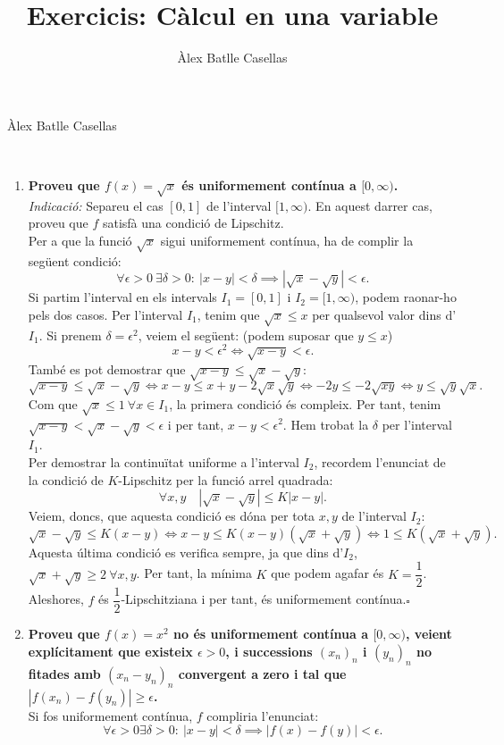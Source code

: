 \documentclass[11pt]{article}
\title{Exercicis: Càlcul en una variable}
\author{Àlex Batlle Casellas}
\begin{document}
\begin{small}
Àlex Batlle Casellas
\end{small}\\
\begin{enumerate}
	\item \textbf{Proveu que $f(x)=\sqrt{x}$ és uniformement contínua a $[0,\infty)$.}\\
	\textit{Indicació:} Separeu el cas $[0,1]$ de l'interval $[1,\infty)$. En aquest darrer cas, proveu que $f$ satisfà una condició de Lipschitz.\\
	Per a que la funció $\sqrt{x}$ sigui uniformement contínua, ha de complir la següent condició:
	$$\forall\epsilon>0\ \exists\delta>0:\ |x-y|<\delta\implies|\sqrt{x}-\sqrt{y}|<\epsilon.$$
	Si partim l'interval en els intervals $I_1=[0,1]$ i $I_2=[1,\infty)$, podem raonar-ho pels dos casos. Per l'interval $I_1$, tenim que $\sqrt{x}\leq x$ per qualsevol valor dins d'$I_1$. Si prenem $\delta=\epsilon^2$, veiem el següent: (podem suposar que $y\leq x$)
	$$
	x-y<\epsilon^2\iff\sqrt{x-y}<\epsilon.
	$$
	També es pot demostrar que $\sqrt{x-y}\leq\sqrt{x}-\sqrt{y}$:
	$$
	\sqrt{x-y}\leq\sqrt{x}-\sqrt{y}\iff x-y\leq x+y-2\sqrt{x}\sqrt{y}\iff-2y\leq-2\sqrt{xy}\iff y\leq\sqrt{y}\sqrt{x}.
	$$
	Com que $\sqrt{x}\leq 1\ \forall x\in I_1$, la primera condició és compleix. Per tant, tenim $\sqrt{x-y}<\sqrt{x}-\sqrt{y}<\epsilon$ i per tant, $x-y<\epsilon^2$. Hem trobat la $\delta$ per l'interval $I_1$.\\
	Per demostrar la continuïtat uniforme a l'interval $I_2$, recordem l'enunciat de la condició de $K$-Lipschitz per la funció arrel quadrada:
	$$\forall x,y\quad |\sqrt{x}-\sqrt{y}|\leq K|x-y|.$$
	Veiem, doncs, que aquesta condició es dóna per tota $x,y$ de l'interval $I_2$:
	$$
	\sqrt{x}-\sqrt{y}\leq K(x-y)\iff x-y\leq K(x-y)(\sqrt{x}+\sqrt{y})\iff1\leq K(\sqrt{x}+\sqrt{y}).
	$$
	Aquesta última condició es verifica sempre, ja que dins d'$I_2$, $\sqrt{x}+\sqrt{y}\geq2\ \forall x,y$. Per tant, la mínima $K$ que podem agafar és $K=\dfrac{1}{2}$. Aleshores, $f$ és $\dfrac{1}{2}$-Lipschitziana i per tant, és uniformement contínua.$\square$
	\item \textbf{Proveu que $f(x)=x^2$ no és uniformement contínua a $[0,\infty)$, veient explícitament que existeix $\epsilon>0$, i successions $(x_n)_n$ i $(y_n)_n$ no fitades amb $(x_n-y_n)_n$ convergent a zero i tal que $|f(x_n)-f(y_n)|\geq\epsilon$.}\\
	Si fos uniformement contínua, $f$ compliria l'enunciat:
	$$
	\forall\epsilon>0\exists\delta>0:\ |x-y|<\delta\implies|f(x)-f(y)|<\epsilon.
$$
\end{enumerate}
\end{document}
